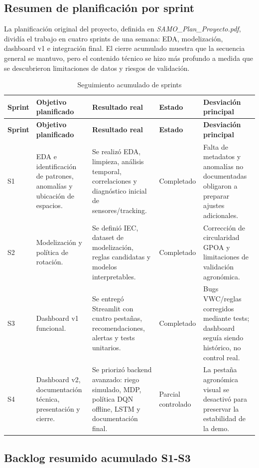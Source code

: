 \documentclass[11pt,a4paper]{article}
\begin{document}
\subsection{Resumen de planificación por sprint}

La planificación original del proyecto, definida en \textit{SAMO\_Plan\_Proyecto.pdf}, dividía el trabajo en cuatro sprints de una semana: EDA, modelización, dashboard v1 e integración final. El cierre acumulado muestra que la secuencia general se mantuvo, pero el contenido técnico se hizo más profundo a medida que se descubrieron limitaciones de datos y riesgos de validación.

\begin{longtable}{p{}p{}p{}p{}p{}}
\caption{Seguimiento acumulado de sprints}\\
\toprule
\textbf{Sprint} & \textbf{Objetivo planificado} & \textbf{Resultado real} & \textbf{Estado} & \textbf{Desviación principal} \\
\midrule
\endfirsthead
\toprule
\textbf{Sprint} & \textbf{Objetivo planificado} & \textbf{Resultado real} & \textbf{Estado} & \textbf{Desviación principal} \\
\midrule
\endhead
S1 & EDA e identificación de patrones, anomalías y ubicación de espacios. & Se realizó EDA, limpieza, análisis temporal, correlaciones y diagnóstico inicial de sensores/tracking. & Completado & Falta de metadatos y anomalías no documentadas obligaron a preparar ajustes adicionales. \\
S2 & Modelización y política de rotación. & Se definió IEC, dataset de modelización, reglas candidatas y modelos interpretables. & Completado & Corrección de circularidad GPOA y limitaciones de validación agronómica. \\
S3 & Dashboard v1 funcional. & Se entregó Streamlit con cuatro pestañas, recomendaciones, alertas y tests unitarios. & Completado & Bugs VWC/reglas corregidos mediante tests; dashboard seguía siendo histórico, no control real. \\
S4 & Dashboard v2, documentación técnica, presentación y cierre. & Se priorizó backend avanzado: riego simulado, MDP, política DQN offline, LSTM y documentación final. & Parcial controlado & La pestaña agronómica visual se desactivó para preservar la estabilidad de la demo. \\
\bottomrule
\end{longtable}

\subsection{Backlog resumido acumulado S1-S3}
\end{document}
